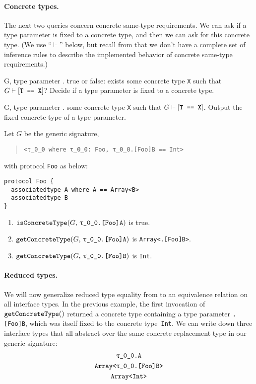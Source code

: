 \documentclass[../generics]{subfiles}
\begin{document}
\paragraph{Concrete types.} The next two queries concern concrete same-type requirements. We can ask if a type parameter is fixed to a concrete type, and then we can ask for this concrete type. (We use ``$\vdash$'' below, but recall from  that we don't have a complete set of inference rules to describe the implemented behavior of concrete same-type requirements.)

\begin{itemize}
{G, \tT}
{type parameter \tT.}
{true or false: exists some concrete type \texttt{X} such that $G\vdash[\texttt{T == X}]$?}
{Decide if a type parameter is fixed to a concrete type.}

{G, \tT}
{type parameter \tT.}
{some concrete type \texttt{X} such that $G\vdash[\texttt{T == X}]$.}
{Output the fixed concrete type of a type parameter.}
\end{itemize}

\begin{example}\label{concrete type query example}
Let $G$ be the generic signature,
\begin{quote}
\begin{verbatim}
<τ_0_0 where τ_0_0: Foo, τ_0_0.[Foo]B == Int>
\end{verbatim}
\end{quote}
with protocol \texttt{Foo} as below:
\begin{Verbatim}
protocol Foo {
  associatedtype A where A == Array<B>
  associatedtype B
}
\end{Verbatim}
\begin{enumerate}
\item $\Query{isConcreteType}{G,\,\texttt{\rT.[Foo]A}}$ is true.
\item $\Query{getConcreteType}{G,\,\texttt{\rT.[Foo]A}}$ is \texttt{Array<\rT.[Foo]B>}.
\item $\Query{getConcreteType}{G,\,\texttt{\rT.[Foo]B}}$ is \texttt{Int}.
\end{enumerate}
\end{example}

\paragraph{Reduced types.} We will now generalize reduced type equality from  to an equivalence relation on all interface types. In the previous example, the first invocation of $\texttt{getConcreteType}()$ returned a concrete type containing a type parameter \texttt{\rT.[Foo]B}, which was itself fixed to the concrete type~\texttt{Int}. We can write down three interface types that all abstract over the same concrete replacement type in our generic signature:
\begin{gather*}
\texttt{\rT.A}\\
\texttt{Array<\rT.[Foo]B>}\\
\texttt{Array<Int>}
\end{gather*}
\end{document}
